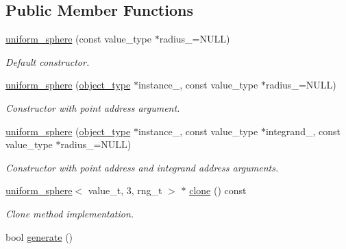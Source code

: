 \subsection*{Public Member Functions}
\begin{DoxyCompactItemize}
\item 
\hypertarget{a00569_a2c09af09b24c57806b2fcbb49a8dd9f3}{}\hyperlink{a00569_a2c09af09b24c57806b2fcbb49a8dd9f3}{uniform\+\_\+sphere} (const value\+\_\+type $\ast$radius\+\_\+=N\+U\+L\+L)\label{a00569_a2c09af09b24c57806b2fcbb49a8dd9f3}

\begin{DoxyCompactList}\small\item\em Default constructor. \end{DoxyCompactList}\item 
\hypertarget{a00569_aa09f20feb57237830be8cf20c70333b4}{}\hyperlink{a00569_aa09f20feb57237830be8cf20c70333b4}{uniform\+\_\+sphere} (\hyperlink{a00579}{object\+\_\+type} $\ast$instance\+\_\+, const value\+\_\+type $\ast$radius\+\_\+=N\+U\+L\+L)\label{a00569_aa09f20feb57237830be8cf20c70333b4}

\begin{DoxyCompactList}\small\item\em Constructor with point address argument. \end{DoxyCompactList}\item 
\hypertarget{a00569_a7099e721f8dde908a9ddde5981d56691}{}\hyperlink{a00569_a7099e721f8dde908a9ddde5981d56691}{uniform\+\_\+sphere} (\hyperlink{a00579}{object\+\_\+type} $\ast$instance\+\_\+, const value\+\_\+type $\ast$integrand\+\_\+, const value\+\_\+type $\ast$radius\+\_\+=N\+U\+L\+L)\label{a00569_a7099e721f8dde908a9ddde5981d56691}

\begin{DoxyCompactList}\small\item\em Constructor with point address and integrand address arguments. \end{DoxyCompactList}\item 
\hypertarget{a00569_aa5d713607492dad2c5f1bb30c86c5458}{}\hyperlink{a00566}{uniform\+\_\+sphere}$<$ value\+\_\+t, 3, rng\+\_\+t $>$ $\ast$ \hyperlink{a00569_aa5d713607492dad2c5f1bb30c86c5458}{clone} () const \label{a00569_aa5d713607492dad2c5f1bb30c86c5458}

\begin{DoxyCompactList}\small\item\em Clone method implementation. \end{DoxyCompactList}\item 
\hypertarget{a00569_a2d1d9de11dbd1832c6c3349b10547b27}{}bool \hyperlink{a00569_a2d1d9de11dbd1832c6c3349b10547b27}{generate} ()\label{a00569_a2d1d9de11dbd1832c6c3349b10547b27}


\end{DoxyCompactItemize}
